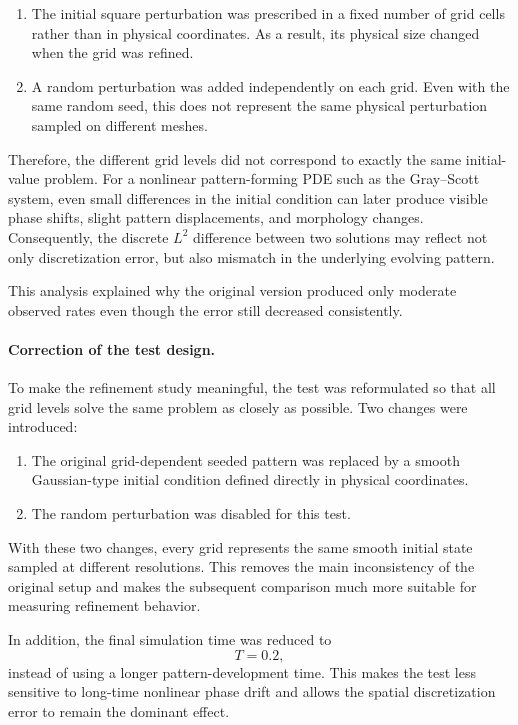 \begin{enumerate}
    \item The initial square perturbation was prescribed in a fixed number of grid cells rather than in physical coordinates. As a result, its physical size changed when the grid was refined.
    \item A random perturbation was added independently on each grid. Even with the same random seed, this does not represent the same physical perturbation sampled on different meshes.
\end{enumerate}

Therefore, the different grid levels did not correspond to exactly the same initial-value problem. For a nonlinear pattern-forming PDE such as the Gray--Scott system, even small differences in the initial condition can later produce visible phase shifts, slight pattern displacements, and morphology changes. Consequently, the discrete \(L^2\) difference between two solutions may reflect not only discretization error, but also mismatch in the underlying evolving pattern.

This analysis explained why the original version produced only moderate observed rates even though the error still decreased consistently.

\paragraph{Correction of the test design.}
To make the refinement study meaningful, the test was reformulated so that all grid levels solve the same problem as closely as possible. Two changes were introduced:

\begin{enumerate}
    \item The original grid-dependent seeded pattern was replaced by a smooth Gaussian-type initial condition defined directly in physical coordinates.
    \item The random perturbation was disabled for this test.
\end{enumerate}

With these two changes, every grid represents the same smooth initial state sampled at different resolutions. This removes the main inconsistency of the original setup and makes the subsequent comparison much more suitable for measuring refinement behavior.

In addition, the final simulation time was reduced to
\[
T = 0.2,
\]
instead of using a longer pattern-development time. This makes the test less sensitive to long-time nonlinear phase drift and allows the spatial discretization error to remain the dominant effect.

